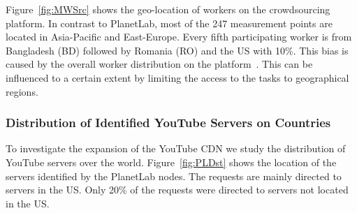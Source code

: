 
Figure~\ref{fig:MWSrc} shows the geo-location of workers on the crowdsourcing platform.
In contrast to PlanetLab, most of the 247 measurement points are located in Asia-Pacific and East-Europe.
Every fifth participating worker is from Bangladesh (BD) followed by Romania (RO) and the US with 10\%.
This bias is caused by the overall worker distribution on the platform~\cite{conf2011-410}.
This can be influenced to a certain extent by limiting the access to the tasks to geographical regions.

\subsubsection{Distribution of Identified YouTube Servers on Countries}

To investigate the expansion of the YouTube CDN we study the distribution of YouTube servers over the world.
Figure~\ref{fig:PLDst} shows the location of the servers identified by the PlanetLab nodes.
The requests are mainly directed to servers in the US. Only 20\% of the requests were directed to servers not located in the US.

